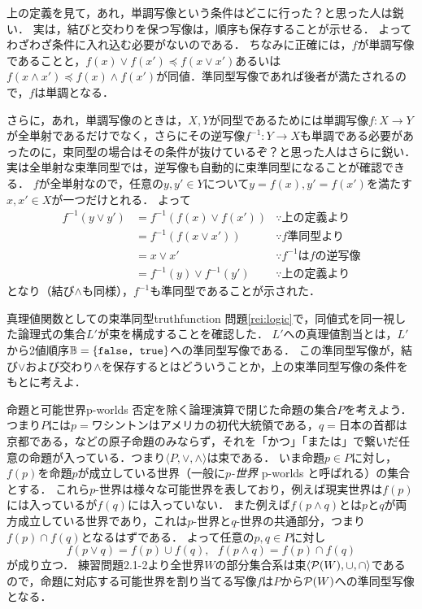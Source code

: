 \documentclass[11pt,a4paper, dvipdfmx]{jsarticle}
\begin{document}
\begin{attn}
上の定義を見て，あれ，単調写像という条件はどこに行った？と思った人は鋭い．
実は，結びと交わりを保つ写像は，順序も保存することが示せる．
よってわざわざ条件に入れ込む必要がないのである．
ちなみに正確には，$f$が単調写像であることと，$f(x) \vee f(x') \preceq f (x \vee x')$あるいは$f(x \wedge x') \preceq f(x) \wedge f(x')$が同値．準同型写像であれば後者が満たされるので，$f$は単調となる．

さらに，あれ，単調写像のときは，$X,Y$が同型であるためには単調写像$f: X \to Y$が全単射であるだけでなく，さらにその逆写像$f^{-1}: Y \to X$も単調である必要があったのに，束同型の場合はその条件が抜けているぞ？と思った人はさらに鋭い．
実は全単射な束準同型では，逆写像も自動的に束準同型になることが確認できる．
$f$が全単射なので，任意の$y, y' \in Y$について$y = f(x), y'=f(x')$を満たす$x, x' \in X$が一つだけとれる．
よって
\begin{align*}
    f^{-1}(y \vee y') 
    &= f^{-1}(f(x) \vee f(x')) & \because \text{上の定義より}\\
    &= f^{-1}(f(x \vee x')) & \because f \text{準同型より} \\
    &= x \vee x' & \because f^{-1} \text{は} f \text{の逆写像} \\
    &= f^{-1}(y) \vee f^{-1}(y') & \because \text{上の定義より}
\end{align*}
となり（結び$\wedge$も同様），$f^{-1}$も準同型であることが示された．
\end{attn}

\begin{rei}{真理値関数としての束準同型}{truthfunction}
問題\ref{rei:logic}で，同値式を同一視した論理式の集合$L'$が束を構成することを確認した．
$L'$への真理値割当とは，$L'$から2値順序$\mathbb{B} = \{ \texttt{false, true} \}$への準同型写像である．
この準同型写像が，結び$\vee$および交わり$\wedge$を保存するとはどういうことか，上の束準同型写像の条件をもとに考えよ．
\end{rei}

\begin{rei}{命題と可能世界}{p-worlds}
否定を除く論理演算で閉じた命題の集合$P$を考えよう．
つまり$P$には$p=$ワシントンはアメリカの初代大統領である，$q=$日本の首都は京都である，などの原子命題のみならず，それを「かつ」「または」で繋いだ任意の命題が入っている．つまり$\langle P, \vee, \wedge \rangle$は束である．
いま命題$p \in P$に対し，$f(p)$を命題$p$が成立している世界（一般に\emph{$p$-世界} p-worlds と呼ばれる）の集合とする．
これら$p$-世界は様々な可能世界を表しており，例えば現実世界は$f(p)$には入っているが$f(q)$には入っていない．
また例えば$f(p \wedge q)$とは$p$と$q$が両方成立している世界であり，これは$p$-世界と$q$-世界の共通部分，つまり$f(p) \cap f(q)$となるはずである．
よって任意の$p, q \in P$に対し
\[ f(p \vee q) = f(p) \cup f(q), \ \ \ f(p \wedge q) = f(p) \cap f(q) \]
が成り立つ．
練習問題2.1-2より全世界$W$の部分集合系は束$\langle \mathcal{P}(W), \cup, \cap \rangle$であるので，命題に対応する可能世界を割り当てる写像$f$は$P$から$\mathcal{P}(W)$への準同型写像となる．
\end{rei}
\end{document}
